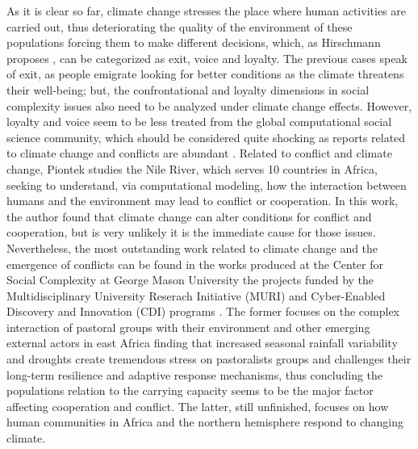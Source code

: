 \documentclass{article}
\begin{document}
As it is clear so far, climate change stresses the place where human activities are carried out, thus deteriorating the quality of the environment of these populations forcing them to make different decisions, which, as Hirschmann proposes \cite{hirschman_exit_1970}, can be categorized as exit, voice and loyalty. The previous cases speak of exit, as people emigrate looking for better conditions as the climate threatens their well-being; but, the confrontational and loyalty dimensions in social complexity issues also need to be analyzed under climate change effects. However, loyalty and voice seem to be less treated from the global computational social science community, which should be considered quite shocking as reports related to climate change and conflicts are abundant \cite{hendrix_climate_2012,hsiang_quantifying_2013,steinbruner_climate_2013}. Related to conflict and climate change, Piontek \cite{piontek_impact_2010} studies the Nile River, which serves 10 countries in Africa, seeking to understand, via computational modeling, how the interaction between humans and the environment may lead to conflict or cooperation. In this work, the author found that climate change can alter conditions for conflict and cooperation, but is very unlikely it is the immediate cause for those issues. Nevertheless, the most outstanding work related to climate change and the emergence of conflicts can be found in the works produced at the Center for Social Complexity at George Mason University the projects funded by the Multidisciplinary University Reserach Initiative (MURI) and Cyber-Enabled Discovery and Innovation (CDI) programs \cite{cioffi-revilla_methodology_2010,hailegiorgis_agent_2010,kennedy_agent-based_2010}. The former focuses on the complex interaction of pastoral groups with their environment and other emerging external actors in east Africa finding that increased seasonal rainfall variability and droughts create tremendous stress on pastoralists groups and challenges their long-term resilience and adaptive response mechanisms, thus concluding the population\textquotesingle s relation to the carrying capacity seems to be the major factor affecting cooperation and conflict. The latter, still unfinished, focuses on how human communities in Africa and the northern hemisphere respond to changing climate.  
\end{document}
